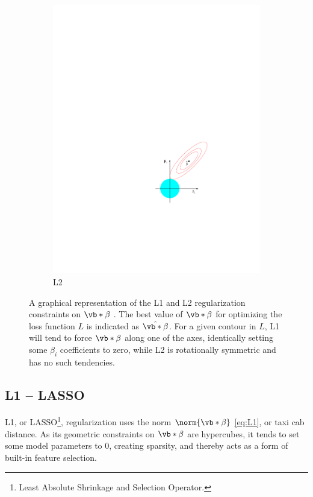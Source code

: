 \begin{figure}[H]
\begin{subfigure}[b]{0.48\textwidth}
      \includegraphics[width=\textwidth]{figures/ml/l2}
  \caption{L2}
  \label{fig:ml:l1l2:L2}
  \end{subfigure}
\caption{
A graphical representation of the L1 and L2 regularization constraints on $\vb*{\beta}$ \cite{HastieTF09}.
The best value of $\vb*{\beta}$ for optimizing the loss function $L$ is indicated as $\hat{\vb*{\beta}}$.
For a given contour in $L$, L1 will tend to force $\vb*{\beta}$ along one of the axes,
identically setting some $\beta_{i}$ coefficients to zero,
while L2 is rotationally symmetric and has no such tendencies.
\label{fig:ml:l1l2}
}
\end{figure}

\subsection{L1 -- LASSO}
\label{ml_general:reg:L1}

L1, or LASSO\footnote{Least Absolute Shrinkage and Selection Operator.},
regularization uses the norm $\norm{\vb*{\beta}}$ \cref{eq:L1}, or taxi cab distance.
As its geometric constraints on $\vb*{\beta}$ are hypercubes,
it tends to set some model parameters to 0, creating sparsity,
and thereby acts as a form of built-in feature selection.

